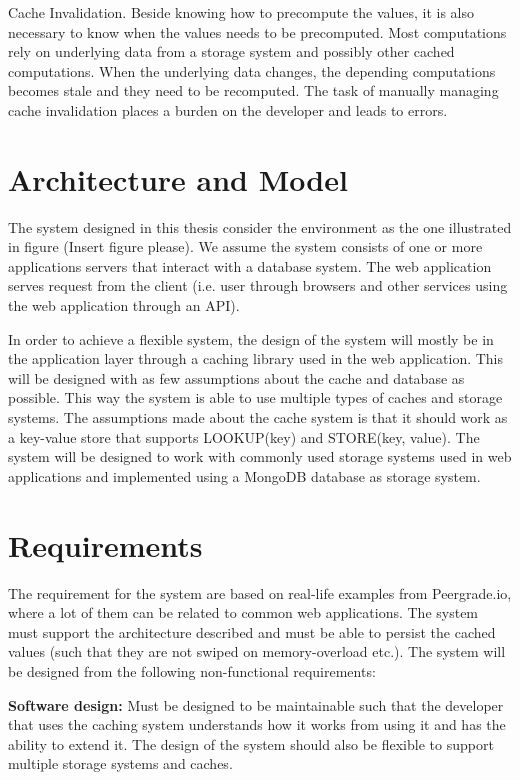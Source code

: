 Cache Invalidation. Beside knowing how to precompute the values, it is also necessary to know when the values needs to be precomputed. Most computations rely on underlying data from a storage system and possibly other cached computations. When the underlying data changes, the depending computations becomes stale and they need to be recomputed. The task of manually managing cache invalidation places a burden on the developer and leads to errors.

\section{Architecture and Model}
The system designed in this thesis consider the environment as the one illustrated in figure (Insert figure please). We assume the system consists of one or more applications servers that interact with a database system. The web application serves request from the client (i.e. user through browsers and other services using the web application through an API).

In order to achieve a flexible system, the design of the system will mostly be in the application layer through a caching library used in the web application. This will be designed with as few assumptions about the cache and database as possible. This way the system is able to use multiple types of caches and storage systems. The assumptions made about the cache system is that it should work as a key-value store that supports LOOKUP(key) and STORE(key, value). The system will be designed to work with commonly used storage systems used in web applications and implemented using a MongoDB database as storage system.

\section{Requirements}

The requirement for the system are based on real-life examples from Peergrade.io, where a lot of them can be related to common web applications. The system must support the architecture described and must be able to persist the cached values (such that they are not swiped on memory-overload etc.). The system will be designed from the following non-functional requirements:

\textbf{Software design:} Must be designed to be maintainable such that the developer that uses the caching system understands how it works from using it and has the ability to extend it. The design of the system should also be flexible to support multiple storage systems and caches.

